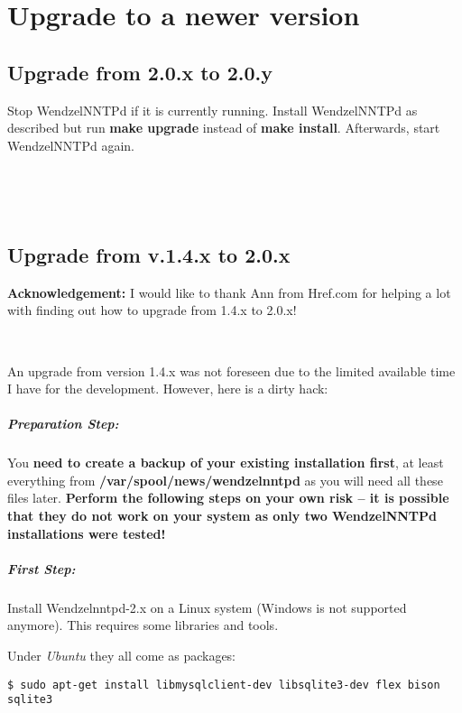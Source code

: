 \chapter{Upgrade to a newer version}\label{Ch:Upgrade}

\section{Upgrade from 2.0.x to 2.0.y}

Stop WendzelNNTPd if it is currently running. Install WendzelNNTPd as described but run {\bf make upgrade} instead of {\bf make install}. Afterwards, start WendzelNNTPd again.

~

~

\section{Upgrade from v.1.4.x to 2.0.x}

{\bf Acknowledgement:} I would like to thank Ann from Href.com for helping a lot with finding out how to upgrade from 1.4.x to 2.0.x!

~

An upgrade from version 1.4.x was not foreseen due to the limited available time I have for the development. However, here is a dirty hack:

\paragraph*{Preparation Step:} You \textbf{need to create a backup of your existing installation first}, at least everything from \textbf{/var/spool/news/wendzelnntpd} as you will need all these files later. \textbf{Perform the following steps on your own risk -- it is possible that they do not work on your system as only two WendzelNNTPd installations were tested!}

\paragraph*{First Step:} Install Wendzelnntpd-2.x on a Linux system (Windows is not supported anymore). This requires some libraries and tools.

Under {\it Ubuntu} they all come as packages:
\begin{verbatim}
$ sudo apt-get install libmysqlclient-dev libsqlite3-dev flex bison sqlite3
\end{verbatim}

